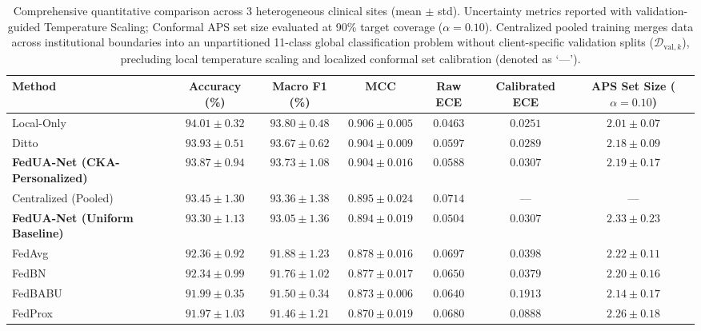 \documentclass[journal]{IEEEtran}
\begin{document}
\begin{table}[t]
\centering
\caption{Comprehensive quantitative comparison across 3 heterogeneous clinical sites (mean $\pm$ std). Uncertainty metrics reported with validation-guided Temperature Scaling; Conformal APS set size evaluated at 90\% target coverage ($\alpha=0.10$). Centralized pooled training merges data across institutional boundaries into an unpartitioned 11-class global classification problem without client-specific validation splits ($\mathcal{D}_{\text{val}, k}$), precluding local temperature scaling and localized conformal set calibration (denoted as `---').}
\label{tab:main_results}
\small
\setlength{\tabcolsep}{3.8pt}
\begin{tabular}{lcccccc}
\toprule
Method & Accuracy (\%) & Macro F1 (\%) & MCC & Raw ECE & Calibrated ECE & APS Set Size ($\alpha=0.10$) \\
\midrule
Local-Only & $94.01 \pm 0.32$ & $93.80 \pm 0.48$ & $0.906 \pm 0.005$ & $0.0463$ & $0.0251$ & $2.01 \pm 0.07$ \\
Ditto & $93.93 \pm 0.51$ & $93.67 \pm 0.62$ & $0.904 \pm 0.009$ & $0.0597$ & $0.0289$ & $2.18 \pm 0.09$ \\
\textbf{FedUA-Net (CKA-Personalized)} & $\mathbf{93.87 \pm 0.94}$ & $\mathbf{93.73 \pm 1.08}$ & $\mathbf{0.904 \pm 0.016}$ & $0.0588$ & $\mathbf{0.0307}$ & $\mathbf{2.19 \pm 0.17}$ \\
Centralized (Pooled) & $93.45 \pm 1.30$ & $93.36 \pm 1.38$ & $0.895 \pm 0.024$ & $0.0714$ & --- & --- \\
\textbf{FedUA-Net (Uniform Baseline)} & $93.30 \pm 1.13$ & $93.05 \pm 1.36$ & $0.894 \pm 0.019$ & $\mathbf{0.0504}$ & $\mathbf{0.0307}$ & $2.33 \pm 0.23$ \\
FedAvg & $92.36 \pm 0.92$ & $91.88 \pm 1.23$ & $0.878 \pm 0.016$ & $0.0697$ & $0.0398$ & $2.22 \pm 0.11$ \\
FedBN & $92.34 \pm 0.99$ & $91.76 \pm 1.02$ & $0.877 \pm 0.017$ & $0.0650$ & $0.0379$ & $2.20 \pm 0.16$ \\
FedBABU & $91.99 \pm 0.35$ & $91.50 \pm 0.34$ & $0.873 \pm 0.006$ & $0.0640$ & $0.1913$ & $2.14 \pm 0.17$ \\
FedProx & $91.97 \pm 1.03$ & $91.46 \pm 1.21$ & $0.870 \pm 0.019$ & $0.0680$ & $0.0888$ & $2.26 \pm 0.18$ \\
\bottomrule
\end{tabular}
\end{table}
\end{document}
